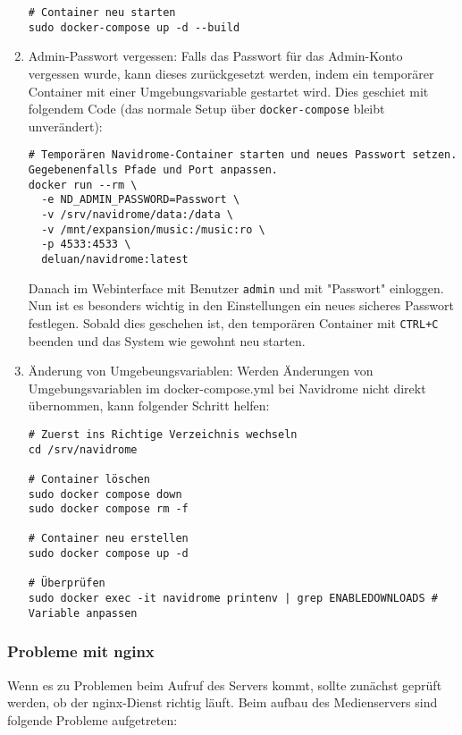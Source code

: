 \documentclass[12pt,a4paper]{report}
\begin{document}
\begin{enumerate}
      \begin{verbatim}
# Container neu starten
sudo docker-compose up -d --build
      \end{verbatim}

      \item Admin-Passwort vergessen:  
      Falls das Passwort für das Admin-Konto vergessen wurde, kann dieses zurückgesetzt werden, indem ein temporärer Container mit einer Umgebungsvariable gestartet wird.  
      Dies geschiet mit folgendem Code (das normale Setup über \texttt{docker-compose} bleibt unverändert):

      \begin{verbatim}
# Temporären Navidrome-Container starten und neues Passwort setzen. Gegebenenfalls Pfade und Port anpassen.
docker run --rm \
  -e ND_ADMIN_PASSWORD=Passwort \
  -v /srv/navidrome/data:/data \
  -v /mnt/expansion/music:/music:ro \
  -p 4533:4533 \
  deluan/navidrome:latest
      \end{verbatim}

      Danach im Webinterface mit Benutzer \texttt{admin} und mit "Passwort" einloggen. Nun ist es besonders wichtig in den Einstellungen ein neues sicheres Passwort festlegen.  
      Sobald dies geschehen ist, den temporären Container mit \texttt{CTRL+C} beenden und das System wie gewohnt neu starten.
    
      \item Änderung von Umgebeungsvariablen:
      Werden Änderungen von Umgebungsvariablen im docker-compose.yml bei Navidrome nicht direkt übernommen, kann folgender Schritt helfen:
      \begin{verbatim}
# Zuerst ins Richtige Verzeichnis wechseln
cd /srv/navidrome

# Container löschen
sudo docker compose down
sudo docker compose rm -f

# Container neu erstellen
sudo docker compose up -d

# Überprüfen
sudo docker exec -it navidrome printenv | grep ENABLEDOWNLOADS # Variable anpassen
      \end{verbatim}
    \end{enumerate}

    \subsubsection*{Probleme mit nginx}
    Wenn es zu Problemen beim Aufruf des Servers kommt, sollte zunächst geprüft werden, ob der nginx-Dienst richtig läuft.
    Beim aufbau des Medienservers sind folgende Probleme aufgetreten:
    
\end{document}
